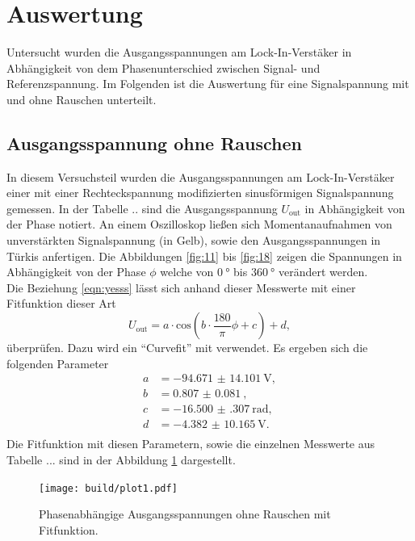 \section{Auswertung}

Untersucht wurden die Ausgangsspannungen am Lock-In-Verstäker in Abhängigkeit von dem Phasenunterschied zwischen Signal- und Referenzspannung. Im Folgenden ist die Auswertung 
für eine Signalspannung mit und ohne Rauschen unterteilt.

\subsection{Ausgangsspannung ohne Rauschen}
In diesem Versuchsteil wurden die Ausgangsspannungen am Lock-In-Verstäker einer mit einer Rechteckspannung modifizierten sinusförmigen Signalspannung gemessen. In der Tabelle ..
sind die Ausgangsspannung $U_{\text{out}}$ in Abhängigkeit von der Phase notiert. An einem Oszilloskop ließen sich Momentanaufnahmen von unverstärkten Signalspannung (in Gelb), sowie den Ausgangsspannungen in Türkis anfertigen.
Die Abbildungen \ref{fig:11} bis \ref{fig:18} zeigen die Spannungen in Abhängigkeit von der Phase $\phi$ welche von $\SI{0}{\degree}$ bis $\SI{360}{\degree}$ verändert werden.
\\
\newline 
Die Beziehung \eqref{eqn:yesss} lässt sich anhand dieser Messwerte mit einer Fitfunktion dieser Art 
\begin{equation}
    \label{eqn:fit}
U_{\text{out}} = a \cdot \text{cos}(b \cdot \frac{180}{\pi} \phi + c) + d,
\end{equation}
überprüfen. Dazu wird ein \enquote{Curvefit} mit \cite{scipy} verwendet.
Es ergeben sich die folgenden Parameter
\begin{align}
    a &= \SI{-94.671(14101)}{\volt},\\
    b &= \SI{0.807(81)}{},\\
    c &= \SI{-16.500(307)}{\radian},\\
    d &= \SI{-4.382(10165)}{\volt}.\\
\end{align}
Die Fitfunktion mit diesen Parametern, sowie die einzelnen Messwerte aus Tabelle ... sind in der Abbildung \ref{fig:licht} dargestellt.
\begin{figure}
    \centering
    \texttt{[image: build/plot1.pdf]}
    \caption{Phasenabhängige Ausgangsspannungen ohne Rauschen mit Fitfunktion.} 
    \label{fig:licht}
\end{figure}
